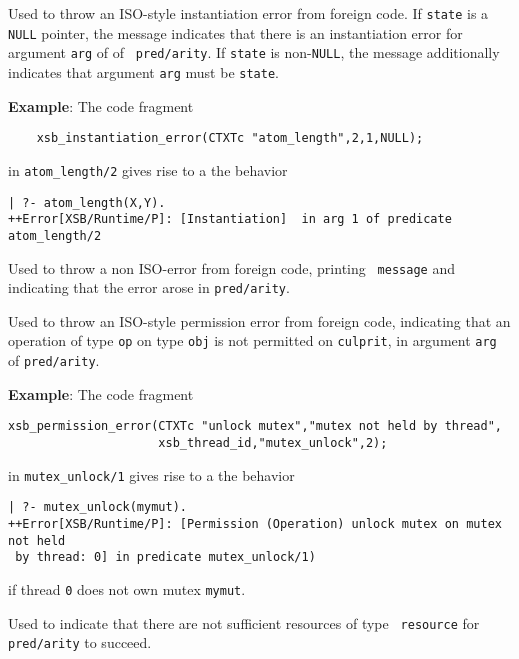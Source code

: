 \begin{description}

%
Used to throw an ISO-style instantiation error from foreign code.  If
{\tt state} is a {\tt NULL} pointer, the message indicates that there
is an instantiation error for argument {\tt arg} of of {\tt
  pred/arity}.  If {\tt state} is non-{\tt NULL}, the message
additionally indicates that argument {\tt arg} must be {\tt state}.

{\bf Example}: The code fragment
%
\begin{verbatim}
    xsb_instantiation_error(CTXTc "atom_length",2,1,NULL);
\end{verbatim}
in {\tt atom\_length/2} gives rise to a the behavior
\begin{verbatim}
| ?- atom_length(X,Y).
++Error[XSB/Runtime/P]: [Instantiation]  in arg 1 of predicate atom_length/2
\end{verbatim}


%
Used to throw a non ISO-error from foreign code, printing {\tt
  message} and indicating that the error arose in {\tt pred/arity}.


%
Used to throw an ISO-style permission error from foreign code,
indicating that an operation of type {\tt op} on type {\tt obj} is not
permitted on {\tt culprit}, in argument {\tt arg} of {\tt pred/arity}.

{\bf Example}: The code fragment
%
\begin{verbatim}
xsb_permission_error(CTXTc "unlock mutex","mutex not held by thread",
                     xsb_thread_id,"mutex_unlock",2);
\end{verbatim}
in {\tt mutex\_unlock/1} gives rise to a the behavior
\begin{verbatim}
| ?- mutex_unlock(mymut).
++Error[XSB/Runtime/P]: [Permission (Operation) unlock mutex on mutex not held
 by thread: 0] in predicate mutex_unlock/1)
\end{verbatim}
if thread {\tt 0} does not own mutex {\tt mymut}.


%
Used to indicate that there are not sufficient resources of type {\tt
  resource} for {\tt pred/arity} to succeed.


\end{description}
